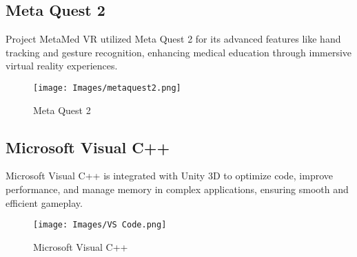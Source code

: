\subsection{Meta Quest 2}
Project MetaMed VR utilized Meta Quest 2 for its advanced features like hand tracking and gesture recognition, enhancing medical education through immersive virtual reality experiences.
\begin{figure}[h]
	\centering
	\texttt{[image: Images/metaquest2.png]}
	\caption{Meta Quest 2\cite{metaquest}}
\end{figure}
\subsection{Microsoft Visual C++}
Microsoft Visual C++ is integrated with Unity 3D to optimize code, improve performance, and manage memory in complex applications, ensuring smooth and efficient gameplay.
\begin{figure}[h]
	\centering
	\texttt{[image: Images/VS Code.png]}
	\caption{Microsoft Visual C++\cite{visual-studio-icon}}
\end{figure}
